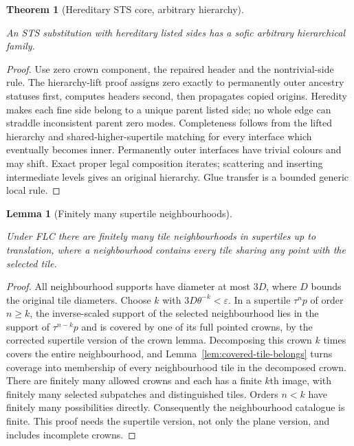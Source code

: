 \documentclass[11pt,a4paper]{article}
\newtheorem{lemma}[definition]{Lemma}
\newtheorem{theorem}[definition]{Theorem}
\theoremstyle{remark}
\newcommand{\lean}[1]{}
\newcommand{\uses}[1]{}
\begin{document}
\begin{theorem}[Hereditary STS core, arbitrary hierarchy]\label{thm:hereditary-hierarchy}
\lean{Tilings.Core.hereditary_sts_hierarchy_sofic}
\uses{def:hereditary,def:sts,lem:certificate-exists,lem:grouping-lift,lem:lift-hierarchy,thm:compose,lem:hierarchy-step,lem:glues}
An STS substitution with hereditary listed sides has a sofic arbitrary
hierarchical family.
\end{theorem}
\begin{proof}
Use zero crown component, the repaired header and the nontrivial-side rule.
The hierarchy-lift proof assigns zero exactly to permanently outer ancestry
statuses first, computes headers second, then propagates copied origins.
Heredity makes each fine side belong to a unique parent listed side; no
whole edge can straddle inconsistent parent zero modes.
Completeness follows from the lifted hierarchy and shared-higher-supertile
matching for every interface which eventually becomes inner. Permanently
outer interfaces have trivial colours and may shift. Exact proper legal
composition iterates; scattering and inserting intermediate levels gives
an original hierarchy. Glue transfer is a bounded generic local rule.
\end{proof}

\begin{lemma}[Finitely many supertile neighbourhoods]\label{lem:finite-neighbourhoods}
\lean{Tilings.FLC.finite_neighbourhoods}
\uses{def:flc,lem:crown-cover-supertile,lem:finiteparents}
Under FLC there are finitely many tile neighbourhoods in supertiles up to
translation, where a neighbourhood contains every tile sharing any point
with the selected tile.
\end{lemma}
\begin{proof}
All neighbourhood supports have diameter at most $3D$, where $D$ bounds
the original tile diameters. Choose $k$ with
$3D\theta^{-k}<\varepsilon$. In a supertile $\tau^n p$ of order $n\geq k$,
the inverse-scaled support of the selected neighbourhood lies in the
support of $\tau^{n-k}p$ and is covered by one of its full pointed crowns,
by the corrected supertile version of the crown lemma. Decomposing this
crown $k$ times covers the entire neighbourhood, and
Lemma~\ref{lem:covered-tile-belongs} turns coverage into membership of
every neighbourhood tile in the decomposed crown. There are finitely many
allowed crowns and each has a finite $k$th image, with finitely many
selected subpatches and distinguished tiles. Orders $n<k$ have finitely
many possibilities directly. Consequently the neighbourhood catalogue is
finite.
This proof needs the supertile version, not only the plane version, and
includes incomplete crowns.
\end{proof}
\end{document}
